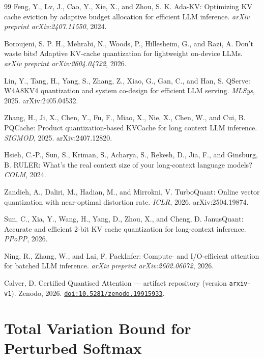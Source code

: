 \documentclass[10pt,twocolumn,a4paper]{article}
\theoremstyle{definition}
\theoremstyle{remark}
\begin{document}
\begin{thebibliography}{99}
Feng, Y., Lv, J., Cao, Y., Xie, X., and Zhou, S. K.
\newblock Ada-KV: Optimizing KV cache eviction by adaptive budget allocation for efficient LLM inference.
\newblock \emph{arXiv preprint arXiv:2407.11550}, 2024.

Boroujeni, S. P. H., Mehrabi, N., Woods, P., Hillesheim, G., and Razi, A.
\newblock Don't waste bits! Adaptive KV-cache quantization for lightweight on-device LLMs.
\newblock \emph{arXiv preprint arXiv:2604.04722}, 2026.

Lin, Y., Tang, H., Yang, S., Zhang, Z., Xiao, G., Gan, C., and Han, S.
\newblock QServe: W4A8KV4 quantization and system co-design for efficient LLM serving.
\newblock \emph{MLSys}, 2025.
\newblock arXiv:2405.04532.

Zhang, H., Ji, X., Chen, Y., Fu, F., Miao, X., Nie, X., Chen, W., and Cui, B.
\newblock PQCache: Product quantization-based KVCache for long context LLM inference.
\newblock \emph{SIGMOD}, 2025.
\newblock arXiv:2407.12820.

Hsieh, C.-P., Sun, S., Kriman, S., Acharya, S., Rekesh, D., Jia, F., and Ginsburg, B.
\newblock RULER: What's the real context size of your long-context language models?
\newblock \emph{COLM}, 2024.

Zandieh, A., Daliri, M., Hadian, M., and Mirrokni, V.
\newblock TurboQuant: Online vector quantization with near-optimal distortion rate.
\newblock \emph{ICLR}, 2026.
\newblock arXiv:2504.19874.

Sun, C., Xia, Y., Wang, H., Yang, D., Zhou, X., and Cheng, D.
\newblock JanusQuant: Accurate and efficient 2-bit KV cache quantization for long-context inference.
\newblock \emph{PPoPP}, 2026.

Ning, R., Zhang, W., and Lai, F.
\newblock PackInfer: Compute- and I/O-efficient attention for batched LLM inference.
\newblock \emph{arXiv preprint arXiv:2602.06072}, 2026.

Calver, D.
\newblock Certified Quantised Attention --- artifact repository (version \texttt{arxiv-v1}).
\newblock Zenodo, 2026.
\newblock \href{https://doi.org/10.5281/zenodo.19915933}{\texttt{doi:10.5281/zenodo.19915933}}.

\end{thebibliography}

\appendix
\section{Total Variation Bound for Perturbed Softmax}
\label{app:tv_proof}
\end{document}
